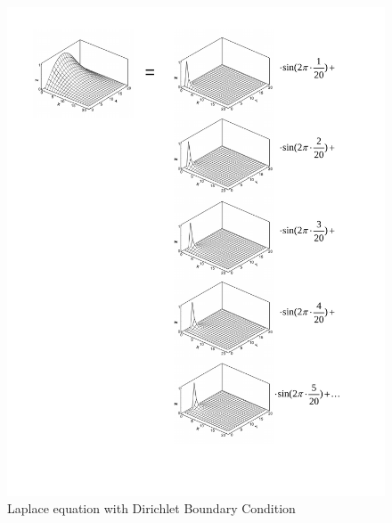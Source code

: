 \begin{figure}[htbp]
\includegraphics[width=6in]{../figures/SES/example_Laplace.pdf}
\caption{Laplace equation with Dirichlet Boundary Condition}
\label{fig:example-Laplace-Dirichlet}
\end{figure}


